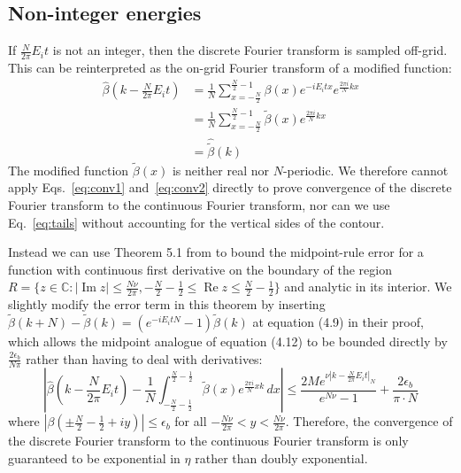 \subsection{Non-integer energies}
If $\frac{N}{2\pi}E_it$ is not an integer, then the discrete Fourier transform is sampled off-grid. This can be reinterpreted as the on-grid Fourier transform of a modified function:
\begin{align}
    \hat \beta(k -\frac{N}{2\pi}E_it) &= \frac{1}{N} \sum_{x=-\frac{N}{2}}^{\frac{N}{2}-1} \beta(x) e^{-iE_it x}e^{\frac{2\pi i}{N} kx}\\
    &= \frac{1}{N} \sum_{x=-\frac{N}{2}}^{\frac{N}{2}-1} \tilde\beta(x)e^{\frac{2\pi i}{N} kx}\\
    &= \hat{\tilde\beta}(k)
\end{align}
The modified function $\tilde\beta(x)$ is neither real nor $N$-periodic. We therefore cannot apply Eqs.~\eqref{eq:conv1} and~\eqref{eq:conv2} directly to prove convergence of the discrete Fourier transform to the continuous Fourier transform, nor can we use Eq.~\eqref{eq:tails} without accounting for the vertical sides of the contour.

Instead we can use Theorem 5.1 from \cite{javed2014trapezoidal} to bound the midpoint-rule error for a function with continuous first derivative on the boundary of the region $R = \{z \in \mathbb{C}: |\operatorname{Im} z| \leq  \frac{N\nu}{2\pi}, -\frac{N}{2}-\frac{1}{2}\leq\operatorname{Re} z \leq \frac{N}{2}-\frac{1}{2}\}$ and analytic in its interior. We slightly modify the error term in this theorem by inserting $\tilde \beta(k+N)- \tilde \beta(k)= (e^{-iE_i tN}-1)\tilde \beta(k)$ at equation (4.9) in their proof, which allows the midpoint analogue of equation (4.12) to be bounded directly by $\frac{2\epsilon_b}{N\pi}$ rather than having to deal with derivatives:
\begin{equation}
    \left| \hat \beta\!\left(k-\frac{N}{2\pi}E_it\right) - \frac{1}{N} \int_{-\frac{N}{2}-\frac{1}{2}}^{\frac{N}{2}-\frac{1}{2}}\tilde\beta(x)e^{\frac{2\pi i}{N}xk}\,dx \right| \leq \frac{2 Me^{\nu|k-\frac{N}{2\pi}E_i t|_{N}}}{e^{N\nu}-1} + \frac{2\epsilon_{b}}{\pi\cdot N}
    \label{eq:noninteger1}
\end{equation}
where $|\beta(\pm\frac{N}{2}-\frac{1}{2}+iy)| \leq \epsilon_{b}$ for all $-\frac{N\nu}{2\pi}<y<\frac{N\nu}{2\pi}$. Therefore, the convergence of the discrete Fourier transform to the continuous Fourier transform is only guaranteed to be exponential in $\eta$ rather than doubly exponential.

